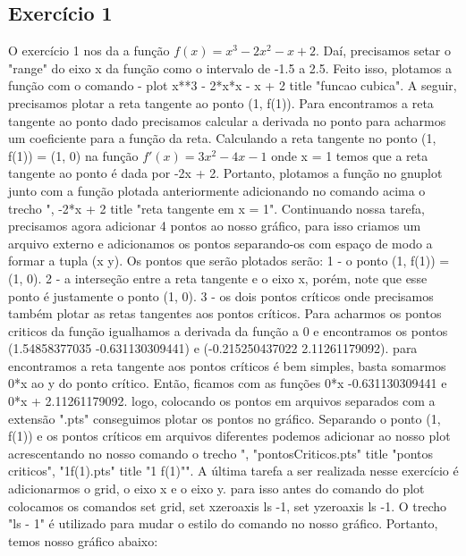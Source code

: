 \documentclass{article}
\begin{document}
    \subsection*{Exercício 1}
    \hspace{1cm}O exercício 1 nos da a função $f(x)=x^3 - 2x^2 -x+2$. Daí, precisamos setar o "range" do eixo x da função como o intervalo de -1.5 a 2.5. Feito isso, plotamos a função com o comando - plot x**3 - 2*x*x - x + 2 title "funcao cubica".
    A seguir, precisamos plotar a reta tangente ao ponto (1, f(1)). Para encontramos a reta tangente ao ponto dado precisamos calcular a derivada no ponto para acharmos um coeficiente para a função da reta. Calculando a reta tangente no ponto (1, f(1)) = (1, 0) na função $f'(x) = 3x^2 - 4x - 1$ onde x = 1 temos que a reta tangente ao ponto é dada por -2x + 2. Portanto, plotamos a função no gnuplot junto com a função plotada anteriormente adicionando no comando acima o trecho ", -2*x + 2 title "reta tangente em x = 1".\newline
    \hspace*{1cm}Continuando nossa tarefa, precisamos agora adicionar 4 pontos ao nosso gráfico, para isso criamos um arquivo externo e adicionamos os pontos separando-os com espaço de modo a formar a tupla (x y). Os pontos que serão plotados serão: 1 - o ponto (1, f(1)) = (1, 0). 2 - a interseção entre a reta tangente e o eixo x, porém, note que esse ponto é justamente o ponto (1, 0). 3 - os dois pontos críticos onde precisamos também plotar as retas tangentes aos pontos críticos. Para acharmos os pontos criticos da função igualhamos a derivada da função a 0 e encontramos os pontos (1.54858377035 -0.631130309441) e (-0.215250437022 2.11261179092).
    para encontramos a reta tangente aos pontos críticos é bem simples, basta somarmos 0*x ao y do ponto crítico. Então, ficamos com as funções 0*x -0.631130309441 e 0*x + 2.11261179092.
    logo, colocando os pontos em arquivos separados com a extensão ".pts" conseguimos plotar os pontos no gráfico. Separando o ponto (1, f(1)) e os pontos críticos em arquivos diferentes podemos adicionar ao nosso plot acrescentando no nosso comando o trecho ", "pontosCriticos.pts" title "pontos criticos", "1f(1).pts" title "1 f(1)"".\newline
    \hspace*{1cm}A última tarefa a ser realizada nesse exercício é adicionarmos o grid, o eixo x e o eixo y. para isso antes do comando do plot colocamos os comandos set grid, set xzeroaxis ls -1, set yzeroaxis ls -1. O trecho "ls - 1" é utilizado para mudar o estilo do comando no nosso gráfico. Portanto, temos nosso gráfico abaixo:
\end{document}
